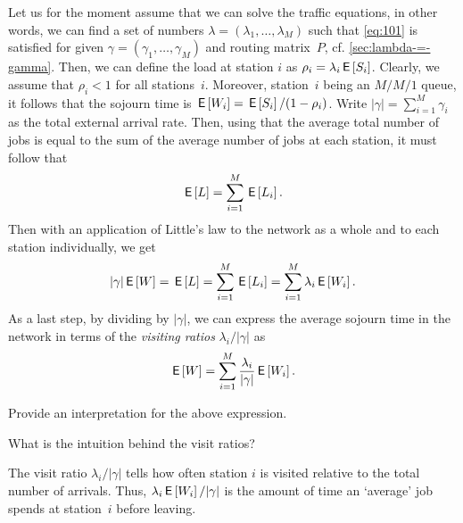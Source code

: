 Let us for the moment assume that we can solve the traffic equations, in other words, we can find a set of numbers $\lambda =(\lambda_1, \ldots, \lambda_M)$ such that \cref{eq:101} is satisfied for given $\gamma =(\gamma_1, \ldots, \gamma_M)$ and routing matrix~$P$, cf.
\cref{sec:lambda-=-gamma}.
Then, we can define the load at station $i$ as $\rho_i = \lambda_i \,\mathsf{E}\left[S_i\right]$.
Clearly, we assume that $\rho_i < 1$ for all stations~$i$.
Moreover, station~$i$ being an $M/M/1$ queue, it follows that the sojourn time is $\,\mathsf{E}\left[W_i\right] = \,\mathsf{E}\left[S_i\right]/(1-\rho_i)$.
Write $|\gamma|= \sum_{i=1}^M \gamma_i$ as the total external arrival rate.
Then, using that the average total number of jobs is equal to the sum of the average number of jobs at each station, it must follow that
\begin{equation*}
 \,\mathsf{E}\left[L\right] = \sum_{i=1}^M \,\mathsf{E}\left[L_i\right].
\end{equation*}
Then with an application of Little's law to the network as a whole and to each station individually, we get
\begin{equation*}
  |\gamma| \,\mathsf{E}\left[W\right] = \,\mathsf{E}\left[L\right] = \sum_{i=1}^M \,\mathsf{E}\left[L_i\right] = \sum_{i=1}^M \lambda_i \,\mathsf{E}\left[W_i\right]. 
\end{equation*}
As a last step, by dividing by $|\gamma|$, we can express the average sojourn time in the network in terms of the \emph{visiting ratios} $\lambda_i/|\gamma|$ as
\begin{equation*}
 \,\mathsf{E}\left[W\right] = \sum_{i=1}^M \frac{\lambda_i}{|\gamma|} \,\mathsf{E}\left[W_i\right]. 
\end{equation*}

\begin{exercise}\label{ex:on-5}
  Provide an interpretation for the above expression.
\begin{hint}
    What  is the intuition behind the visit ratios?
\end{hint}
\begin{solution}
  The visit ratio $\lambda_i/|\gamma|$ tells how often station $i$ is visited relative to the total number of arrivals.
  Thus, $\lambda_i \,\mathsf{E}\left[W_i\right] /|\gamma|$ is the amount of time an `average' job spends at station~$i$ before leaving.
\end{solution}
\end{exercise}

